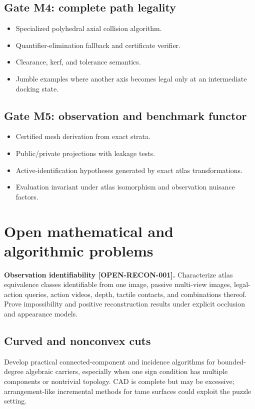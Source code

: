 \documentclass[11pt,openany]{book}
\newcommand{\claimid}[1]{\textnormal{\sffamily\footnotesize[#1]}}
\theoremstyle{polyplain}
\theoremstyle{polydef}
\begin{document}
\subsection*{Gate M4: complete path legality}
\begin{itemize}
  \item Specialized polyhedral axial collision algorithm.
  \item Quantifier-elimination fallback and certificate verifier.
  \item Clearance, kerf, and tolerance semantics.
  \item Jumble examples where another axis becomes legal only at an intermediate docking state.
\end{itemize}

\subsection*{Gate M5: observation and benchmark functor}
\begin{itemize}
  \item Certified mesh derivation from exact strata.
  \item Public/private projections with leakage tests.
  \item Active-identification hypotheses generated by exact atlas transformations.
  \item Evaluation invariant under atlas isomorphism and observation nuisance factors.
\end{itemize}

\section{Open mathematical and algorithmic problems}

\begin{warningbox}[label={open:reconstruction}]
\textbf{Observation identifiability \claimid{OPEN-RECON-001}.}
Characterize atlas equivalence classes identifiable from one image, passive multi-view images, legal-action queries, action videos, depth, tactile contacts, and combinations thereof. Prove impossibility and positive reconstruction results under explicit occlusion and appearance models.
\end{warningbox}

\subsection{Curved and nonconvex cuts}
Develop practical connected-component and incidence algorithms for bounded-degree algebraic carriers, especially when one sign condition has multiple components or nontrivial topology. CAD is complete but may be excessive; arrangement-like incremental methods for tame surfaces could exploit the puzzle setting.
\end{document}
